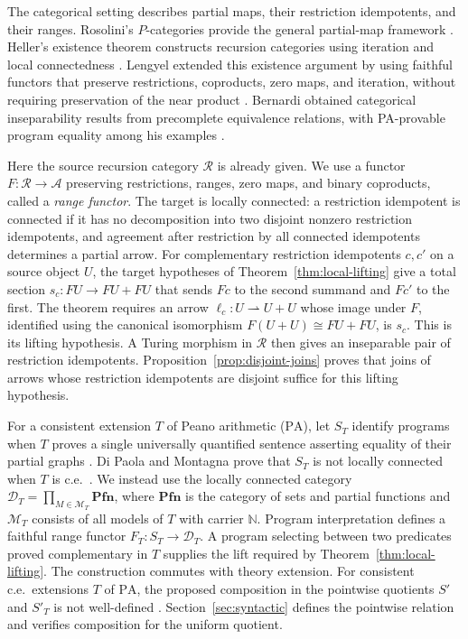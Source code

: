 \documentclass[11pt]{article}
\newcommand{\N}{\mathbb N}
\newcommand{\PA}{\mathrm{PA}}
\newcommand{\Pfn}{\mathbf{Pfn}}
\begin{document}
The categorical setting describes partial maps, their restriction
idempotents, and their ranges. Rosolini's $P$-categories provide the general
partial-map framework \cite{RosoliniThesis,Rosolini}.
Heller's existence theorem constructs recursion categories using
iteration and local connectedness \cite[Sections 8--9]{Heller}.
Lengyel extended this existence argument by using faithful functors
that preserve restrictions, coproducts, zero maps, and iteration, without
requiring preservation of the near product \cite{Lengyel2004,Corrections}.
Bernardi obtained categorical inseparability results from precomplete
equivalence relations, with PA-provable program equality among his
examples \cite[pp.~125--128]{Bernardi}.

Here the source recursion category $\mathscr R$ is already given.
We use a functor $F:\mathscr R\to\mathcal A$ preserving restrictions,
ranges, zero maps, and binary coproducts, called a \emph{range functor}.
The target is locally connected: a restriction idempotent is connected
if it has no decomposition into two disjoint nonzero restriction
idempotents, and agreement after restriction by all connected
idempotents determines a partial arrow. For complementary restriction
idempotents $c,c'$ on a source object $U$, the target hypotheses of
Theorem~\ref{thm:local-lifting} give a total section
$s_c:FU\to FU+FU$ that sends $Fc$ to the second summand and $Fc'$
to the first. The theorem requires an arrow
$\ell_c:U\rightharpoonup U+U$ whose image under $F$, identified
using the canonical isomorphism $F(U+U)\cong FU+FU$, is $s_c$.
This is its lifting hypothesis. A Turing morphism in $\mathscr R$
then gives an inseparable pair of restriction idempotents.
Proposition~\ref{prop:disjoint-joins}
proves that joins of arrows whose restriction idempotents are disjoint
suffice for this lifting hypothesis.

For a consistent extension $T$ of Peano arithmetic ($\PA$), let
$S_T$ identify programs when $T$ proves a single universally quantified
sentence asserting equality of their partial graphs
\cite{Montagna,DPM}. Di Paola and Montagna prove that $S_T$ is not
locally connected when $T$ is c.e.\ \cite[Corollary 4.4]{DPM}.
We instead use the locally connected category
$\mathcal D_T=\prod_{M\in\mathcal M_T}\Pfn$, where $\Pfn$ is the
category of sets and partial functions and $\mathcal M_T$ consists of
all models of $T$ with carrier $\N$. Program interpretation defines a
faithful range functor $F_T:S_T\to\mathcal D_T$. A program selecting
between two predicates proved complementary in $T$ supplies the lift
required by Theorem~\ref{thm:local-lifting}. The construction commutes
with theory extension. For consistent c.e.\ extensions $T$ of $\PA$,
the proposed composition in the pointwise quotients $S'$ and $S'_T$
is not well-defined
\cite[Corollary 2]{Composition}. Section~\ref{sec:syntactic} defines
the pointwise relation and verifies composition for the uniform quotient.
\end{document}
